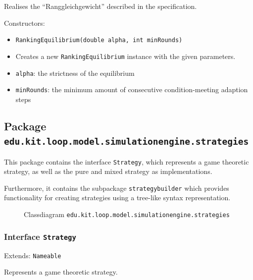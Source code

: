 \documentclass[parskip=full,11pt]{scrartcl}
\begin{document}
Realises the \enquote{Ranggleichgewicht} described in the specification.

Constructors:
\begin{itemize}\itemsep -10pt
\item \texttt{RankingEquilibrium(double alpha, int minRounds)}
\item[] Creates a new \texttt{RankingEquilibrium} instance with the given parameters.
\item[] \texttt{alpha}: the strictness of the equilibrium
\item[] \texttt{minRounds}: the minimum amount of consecutive condition-meeting adaption steps
\end{itemize}

\subsection{Package \texttt{edu.kit.loop.model.simulationengine.strategies}}
This package contains the interface \texttt{Strategy}, which represents a game theoretic strategy, as well as the pure and mixed strategy as implementations.

Furthermore, it contains the subpackage \texttt{strategybuilder} which provides functionality for creating strategies using a tree-like syntax representation.

\iftrue
\begin{figure}[h]
	\centering
	\fontsize{6}{8}\selectfont
	

	\caption{Classdiagram \texttt{edu.kit.loop.model.simulationengine.strategies}}
\end{figure}
\fi
\subsubsection{Interface \texttt{Strategy}}
Extends: \texttt{Nameable}

Represents a game theoretic strategy.
\end{document}
